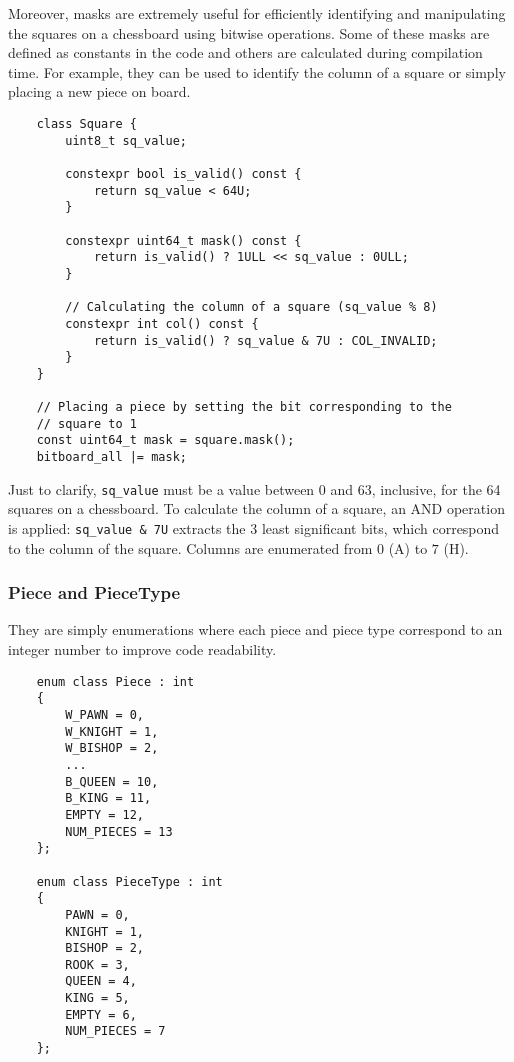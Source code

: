 \vspace{1em}

\noindent Moreover, masks are extremely useful for efficiently identifying and manipulating the squares on a chessboard using bitwise operations. Some of these masks are defined as constants in the code and others are calculated during compilation time. For example, they can be used to identify the column of a square or simply placing a new piece on board.

\begin{lstlisting}
    class Square {
        uint8_t sq_value;

        constexpr bool is_valid() const {
            return sq_value < 64U;
        }

        constexpr uint64_t mask() const {
            return is_valid() ? 1ULL << sq_value : 0ULL;
        }

        // Calculating the column of a square (sq_value % 8)
        constexpr int col() const {
            return is_valid() ? sq_value & 7U : COL_INVALID;
        }
    }

    // Placing a piece by setting the bit corresponding to the
    // square to 1
    const uint64_t mask = square.mask();
    bitboard_all |= mask;
\end{lstlisting}

\noindent Just to clarify, \texttt{sq\_value} must be a value between $0$ and $63$, inclusive, for the 64 squares on a chessboard. To calculate the column of a square, an AND operation is applied: \texttt{sq\_value \& 7U} extracts the 3 least significant bits, which correspond to the column of the square. Columns are enumerated from $0$ (A) to $7$ (H).

\subsubsection{Piece and PieceType}

They are simply enumerations where each piece and piece type correspond to an integer number to improve code readability.

\begin{lstlisting}
    enum class Piece : int
    {
        W_PAWN = 0,
        W_KNIGHT = 1,
        W_BISHOP = 2,
        ...
        B_QUEEN = 10,
        B_KING = 11,
        EMPTY = 12,
        NUM_PIECES = 13
    };

    enum class PieceType : int
    {
        PAWN = 0,
        KNIGHT = 1,
        BISHOP = 2,
        ROOK = 3,
        QUEEN = 4,
        KING = 5,
        EMPTY = 6,
        NUM_PIECES = 7
    };
\end{lstlisting}

